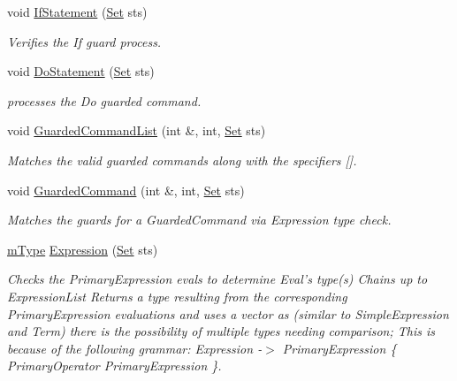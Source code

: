\begin{DoxyCompactItemize}
void \hyperlink{classParser_af7ef9a71f5e821040a16974c4602e23e}{IfStatement} (\hyperlink{classSet}{Set} sts)
\begin{DoxyCompactList}\small\item\em Verifies the If guard process. \item\end{DoxyCompactList}\item 
void \hyperlink{classParser_ae1ced275b4dafa58b751c66333a41f98}{DoStatement} (\hyperlink{classSet}{Set} sts)
\begin{DoxyCompactList}\small\item\em processes the Do guarded command. \item\end{DoxyCompactList}\item 
void \hyperlink{classParser_a071376c630a3e05acaf3b16c35736bf2}{GuardedCommandList} (int \&, int, \hyperlink{classSet}{Set} sts)
\begin{DoxyCompactList}\small\item\em Matches the valid guarded commands along with the specifiers \mbox{[}\mbox{]}. \item\end{DoxyCompactList}\item 
void \hyperlink{classParser_a0259d21a13d0fcf20a813ad5ce70d454}{GuardedCommand} (int \&, int, \hyperlink{classSet}{Set} sts)
\begin{DoxyCompactList}\small\item\em Matches the guards for a GuardedCommand via Expression type check. \item\end{DoxyCompactList}\item 
\hyperlink{blocktable_8h_a636cfca014f3212ea82d45e28f9cb51b}{mType} \hyperlink{classParser_ab441560920f594e80d354c51ce64b77e}{Expression} (\hyperlink{classSet}{Set} sts)
\begin{DoxyCompactList}\small\item\em Checks the PrimaryExpression evals to determine Eval's type(s) Chains up to ExpressionList Returns a type resulting from the corresponding PrimaryExpression evaluations and uses a vector as (similar to SimpleExpression and Term) there is the possibility of multiple types needing comparison; This is because of the following grammar: Expression -\/$>$ PrimaryExpression \{ PrimaryOperator PrimaryExpression \}. \item\end{DoxyCompactList}\item 

\end{DoxyCompactItemize}
